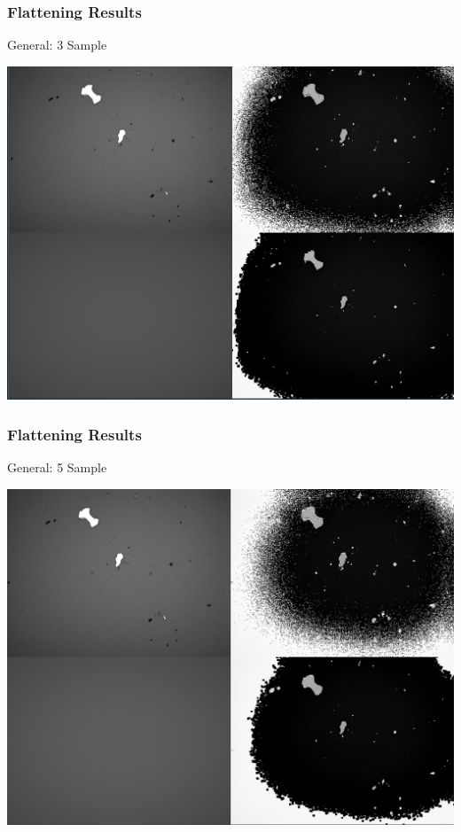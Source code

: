 \documentclass{beamer}
\begin{document}
\begin{frame}
	\frametitle{Flattening Results}
	General: 3 Sample
	\begin{center}
		\includegraphics[scale = 0.25]{image/3samp.png}
	\end{center}
\end{frame}

\begin{frame}
	\frametitle{Flattening Results}
	General: 5 Sample
	\begin{center}
		\includegraphics[scale = 0.25]{image/5samp.png}
	\end{center}
\end{frame}
\end{document}
